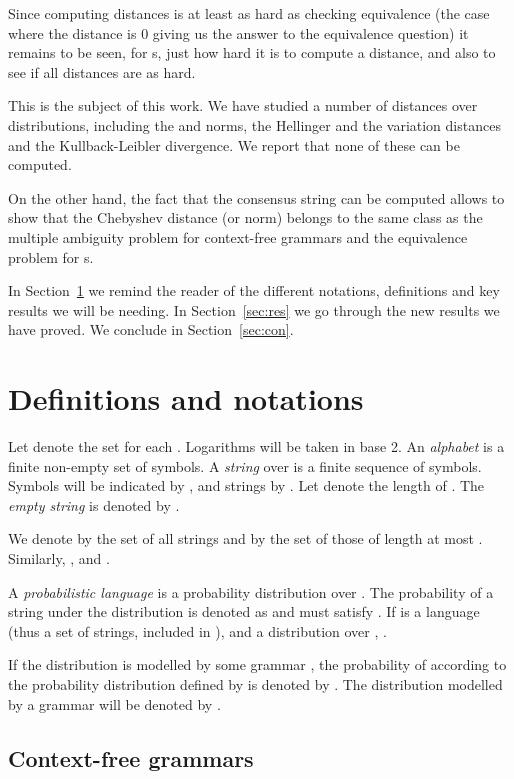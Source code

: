\documentclass[submission]{eptcs} \usepackage{breakurl}             \usepackage[english]{babel}
\begin{document}
Since computing distances is at least as hard as checking equivalence (the case where the distance is 0 giving us the answer to the equivalence question) it remains to be seen, for s, just how hard it is to compute a distance, and also to see if all distances are as hard.

This is the subject of this work. We have studied a number of distances over distributions, including the  and  norms, the Hellinger and the variation distances and the Kullback-Leibler divergence. We report that none of these can be computed.

On the other hand, the fact that the consensus string can be computed allows to show that  the Chebyshev distance (or  norm) belongs to the same class as the multiple ambiguity problem for context-free grammars and the equivalence problem for s.

In Section~\ref{sec:def} we remind the reader of the different notations, definitions and key results we will be needing. In Section~\ref{sec:res} we go through the new results we have proved. We conclude in Section~\ref{sec:con}.

\section{Definitions and notations}\label{sec:def}
Let  denote the set  for each . Logarithms will be taken in base 2.
An \emph{alphabet}  is a finite non-empty set of symbols.
A \textit{string}  over  is a finite sequence 
of symbols. Symbols  will be indicated by ,
and  strings by .
Let  denote the length of .
The \emph{empty string} is denoted by .

We denote by  the set of all strings and by 
the set of those of length at most . Similarly, 
,
 and 
.


A \emph{probabilistic language} 
is a probability distribution over .
The probability of a string  under the
distribution  is denoted as
\label{index:prob}
and must satisfy .
If  is a language (thus a set of strings, included in ),
and  a distribution over ,
.


If the distribution is modelled by some grammar ,
the probability of  according to the probability distribution
defined by  is denoted by
. The distribution modelled by a grammar  will
be denoted by .


\subsection{Context-free grammars}
\end{document}

